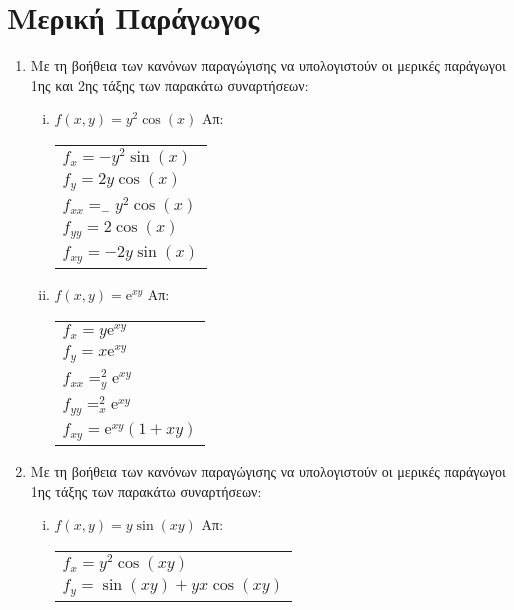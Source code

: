 



\pagestyle{askhseis}




\begin{center}
  \minibox{\large \bfseries \textcolor{Col1}{Ασκήσεις στις Μερικές Παραγώγους}}
\end{center}

\vspace{\baselineskip}


\section*{Μερική Παράγωγος}

\begin{enumerate}
  \item Με τη βοήθεια των κανόνων παραγώγισης να υπολογιστούν οι μερικές 
    παράγωγοι 1ης και 2ης  τάξης των παρακάτω συναρτήσεων:
    \begin{enumerate}[i)]
      \item $f(x,y)=y^2\cos (x)$ \hfill Απ: \begin{tabular}{l}
          $f_x=-y^2\sin(x)$ \\ 
          $f_y=2y\cos(x)$ \\
          $f_{xx}=_-y^2\cos(x)$ \\
          $f_{yy}=2\cos(x)$ \\
          $f_{xy}=-2y\sin(x)$ 
        \end{tabular}

      \item $f(x,y)= \mathrm{e}^{xy}$ \hfill Απ: \begin{tabular}{l}
          $f_x= y \mathrm{e}^{xy} $ \\ 
          $f_y= x \mathrm{e}^{xy} $ \\ 
          $f_{xx}=_y^2 \mathrm{e}^{xy} $ \\
          $f_{yy}=_x^2 \mathrm{e}^{xy} $ \\
          $f_{xy}= \mathrm{e}^{xy} (1+xy) $
        \end{tabular}
    \end{enumerate}


  \item Με τη βοήθεια των κανόνων παραγώγισης να υπολογιστούν οι μερικές 
    παράγωγοι 1ης τάξης των παρακάτω συναρτήσεων:

    \begin{enumerate}[i)]
      \item $f(x,y)=y\sin (xy)$ \hfill Απ: \begin{tabular}{l}
          $f_x=y^2\cos(xy)$ \\ 
          $f_y=\sin(xy)+yx\cos(xy)$
        \end{tabular}


\end{enumerate}
\end{enumerate}
